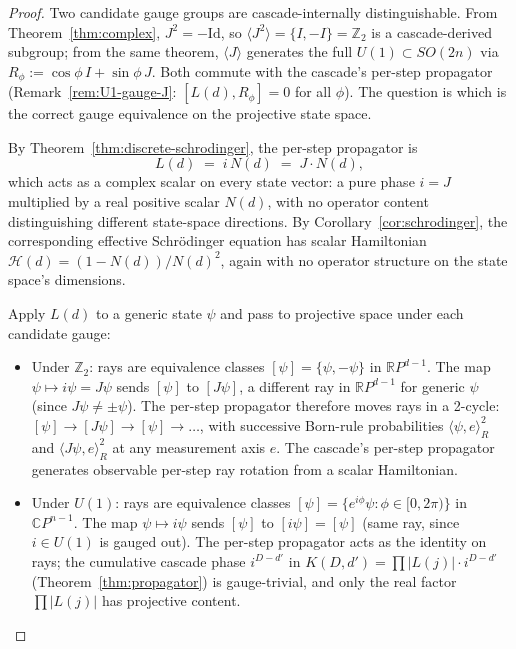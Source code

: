 \documentclass[12pt,a4paper]{article}
\begin{document}
\begin{proof}
Two candidate gauge groups are cascade-internally distinguishable. From
Theorem~\ref{thm:complex}, $J^2 = -\mathrm{Id}$, so $\langle J^2\rangle =
\{I, -I\} = \mathbb{Z}_2$ is a cascade-derived subgroup; from the same
theorem, $\langle J\rangle$ generates the full $U(1) \subset SO(2n)$ via
$R_\phi := \cos\phi\,I + \sin\phi\,J$. Both commute with the cascade's
per-step propagator (Remark~\ref{rem:U1-gauge-J}: $[L(d), R_\phi] = 0$ for
all $\phi$). The question is which is the correct gauge equivalence on
the projective state space.

By Theorem~\ref{thm:discrete-schrodinger}, the per-step propagator is
\[
L(d) \;=\; i\,N(d) \;=\; J \cdot N(d),
\]
which acts as a complex scalar on every state vector: a pure phase $i = J$
multiplied by a real positive scalar $N(d)$, with no operator content
distinguishing different state-space directions. By
Corollary~\ref{cor:schrodinger}, the corresponding effective Schr\"odinger
equation has scalar Hamiltonian $\mathcal{H}(d) = (1-N(d))/N(d)^2$, again
with no operator structure on the state space's dimensions.

Apply $L(d)$ to a generic state $\psi$ and pass to projective space under
each candidate gauge:
\begin{itemize}
\item Under $\mathbb{Z}_2$: rays are equivalence classes
$[\psi] = \{\psi, -\psi\}$ in $\mathbb{R}P^{d-1}$. The map
$\psi \mapsto i\psi = J\psi$ sends $[\psi]$ to $[J\psi]$, a different
ray in $\mathbb{R}P^{d-1}$ for generic $\psi$ (since $J\psi \neq \pm\psi$).
The per-step propagator therefore moves rays in a 2-cycle:
$[\psi]\to [J\psi]\to[\psi]\to\ldots$, with successive Born-rule
probabilities $\langle\psi, e\rangle_R^2$ and $\langle J\psi, e\rangle_R^2$
at any measurement axis $e$. The cascade's per-step propagator generates
observable per-step ray rotation from a scalar Hamiltonian.
\item Under $U(1)$: rays are equivalence classes
$[\psi] = \{e^{i\phi}\psi : \phi \in [0, 2\pi)\}$ in $\mathbb{C}P^{n-1}$.
The map $\psi \mapsto i\psi$ sends $[\psi]$ to $[i\psi] = [\psi]$ (same
ray, since $i \in U(1)$ is gauged out). The per-step propagator acts as
the identity on rays; the cumulative cascade phase $i^{D-d'}$ in
$K(D, d') = \prod|L(j)| \cdot i^{D-d'}$ (Theorem~\ref{thm:propagator})
is gauge-trivial, and only the real factor $\prod|L(j)|$ has projective
content.
\end{itemize}


\end{proof}
\end{document}
